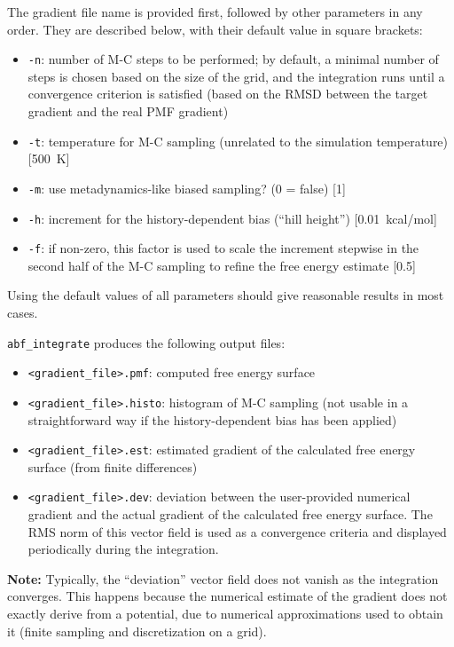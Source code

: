 The gradient file name is provided first, followed by other parameters in any order.
They are described below, with their default value in square brackets:
\begin{itemize}
\setlength{\itemsep}{0pt}
\item \texttt{-n}: number of M-C steps to be performed; by default, a minimal number of
steps is chosen based on the size of the grid, and the integration runs until a convergence
criterion is satisfied (based on the RMSD between the target gradient and the real PMF gradient)
\item \texttt{-t}: temperature for M-C sampling (unrelated to the simulation temperature)
  [500~K]
\item \texttt{-m}: use metadynamics-like biased sampling? (0 = false) [1]
\item \texttt{-h}: increment for the history-dependent bias (``hill height'') [0.01~kcal/mol]
\item \texttt{-f}: if non-zero, this factor is used to scale the increment stepwise in the 
  second half of the M-C sampling to refine the free energy estimate [0.5]
\end{itemize}

Using the default values of all parameters should give reasonable results in most cases.

\bigskip
\texttt{abf\_integrate} produces the following output files:
\begin{itemize}
\setlength{\itemsep}{0pt}
\item \texttt{<gradient\_file>.pmf}: computed free energy surface
\item \texttt{<gradient\_file>.histo}: histogram of M-C sampling (not
usable in a straightforward way if the history-dependent bias has been applied)
\item \texttt{<gradient\_file>.est}: estimated gradient of the calculated free energy surface
(from finite differences)
\item \texttt{<gradient\_file>.dev}: deviation between the user-provided numerical gradient
and the actual gradient of the calculated free energy surface. The RMS norm of this vector
field is used as a convergence criteria and displayed periodically during the integration.
\end{itemize}

\textbf{Note:} Typically, the ``deviation'' vector field does not
vanish as the integration converges. This happens because the
numerical estimate of the gradient does not exactly derive from a
potential, due to numerical approximations used to obtain it (finite
sampling and discretization on a grid).


